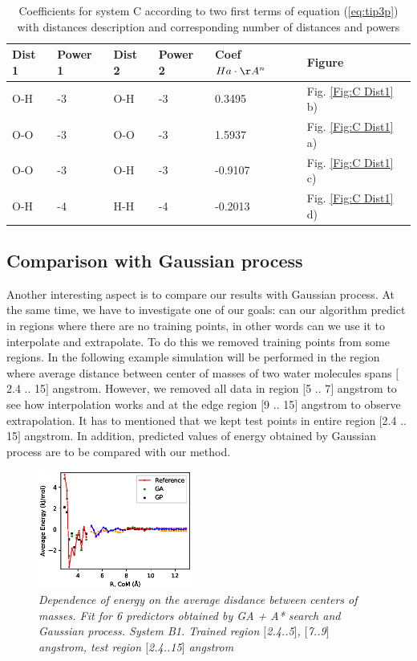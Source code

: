 \documentclass[aps,prl,reprint,amsmath,amssymb,nature]{revtex4-1}
\begin{document}
\begin{table}[h]
\caption{Coefficients for system C according to two first terms of equation (\ref{eq:tip3p}) with distances description and corresponding number of distances and powers}
\label{Tab:C coefficients}
\begin{tabular}{|l|l|l|l|l|l|}
\hline
\textbf{Dist 1} & \textbf{Power 1} & \textbf{Dist 2} & \textbf{
Power 2} & \textbf{Coef $Ha\cdot\AA^n$} & \textbf{Figure} \\
\hline
O-H & -3 & O-H & -3 & 0.3495 & Fig. \ref{Fig:C Dist1} b) \\
\hline
O-O & -3 & O-O & -3 & 1.5937 & Fig. \ref{Fig:C Dist1} a) \\
\hline
O-O & -3 & O-H & -3 & -0.9107 & Fig. \ref{Fig:C Dist1} c) \\
\hline
O-H & -4 & H-H & -4 & -0.2013 & Fig. \ref{Fig:C Dist1} d) \\
\hline
\end{tabular}
\end{table}


\subsection{Comparison with Gaussian process}

Another interesting aspect is to compare our results with Gaussian 
process. At the same time, we have to investigate one of our goals: can 
our algorithm predict in regions where there are no training points, in 
other words can we use it to interpolate and extrapolate. To do this we 
removed training points from some regions. In the following example 
simulation will be performed in the region where average distance 
between center of masses of two water molecules spans $[$2.4 .. 15$]$ 
angstrom. However, we removed all data in region $[$5 .. 7$]$ angstrom 
to see how interpolation works and at the edge region $[$9 .. 15$]$ 
angstrom to observe extrapolation. It has to mentioned that we kept test 
points in entire region $[$2.4 .. 15$]$ angstrom. In addition, predicted 
values of energy obtained by Gaussian process are to be compared with 
our method. 

\begin{figure}[h]
\centering
\includegraphics[width=0.45\textwidth]{media/B1_gap_Energy_6_predictors.eps}
\caption{\textit{Dependence of energy on the average disdance between centers of masses. Fit for 6 predictors obtained by GA + A* search and Gaussian process. System B1. Trained region $[$2.4..5$]$, 
$[$7..9$]$ angstrom, test region $[$2.4..15$]$ angstrom}}
\label{Fig:B1_gap_energy_6_predictors}
\end{figure}
\end{document}
